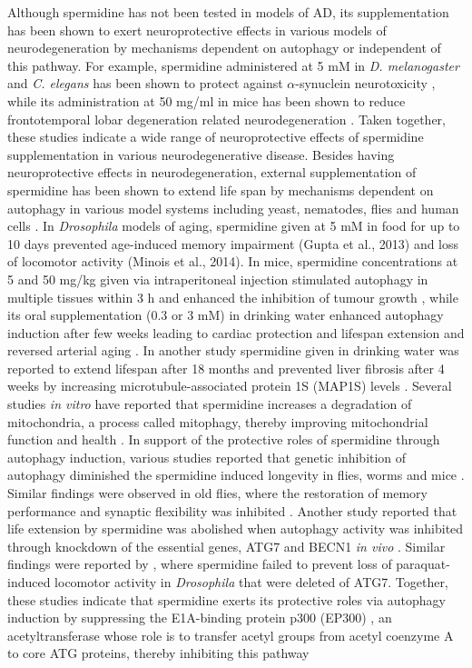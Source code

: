 Although spermidine has not been tested in models of AD, its supplementation has been shown to exert neuroprotective effects in various models of neurodegeneration  by mechanisms dependent on autophagy or independent of this pathway. For example, spermidine administered at 5 mM in \textit{D. melanogaster}  and \textit{C. elegans} has been shown to protect against $\alpha$-synuclein neurotoxicity \citep{Buttner2014}, while its administration at  50 mg/ml in mice has been shown to reduce frontotemporal lobar degeneration related neurodegeneration \citep{Wang2012}. Taken together, these studies indicate a wide range of neuroprotective effects of spermidine supplementation in various neurodegenerative disease. Besides having neuroprotective effects in neurodegeneration, external supplementation of spermidine has been shown to extend life span by mechanisms dependent on autophagy in various model systems including yeast, nematodes, flies \citep{Eisenberg2009,Minois2012,Morselli2011} and human cells \citep{Eisenberg2009,Garcia-Prat2016,Morselli2011,Pietrocola2015}. In \textit{Drosophila} models of aging, spermidine given at 5 mM in food for up to 10 days prevented age-induced memory impairment (Gupta et al., 2013) and loss of locomotor activity (Minois et al., 2014). In mice, spermidine concentrations at 5 and 50 mg/kg given via intraperitoneal injection stimulated autophagy in multiple tissues within 3 h \citep{Morselli2011,Pucciarelli2012} and enhanced the inhibition of tumour growth \citep{Pietrocola2016}, while its oral supplementation (0.3 or  3 mM) in drinking water enhanced autophagy induction after few weeks leading to cardiac protection and lifespan extension \citep{Eisenberg2016a} and reversed arterial aging \citep{LaRocca2013}. In another study spermidine given in drinking water was reported to extend lifespan after 18 months and prevented liver fibrosis after 4 weeks by increasing microtubule-associated protein 1S (MAP1S) levels \citep{Yue2017}. Several studies \textit{in vitro} have reported that spermidine increases a degradation of mitochondria, a process called mitophagy, thereby improving mitochondrial function and health \citep{Eisenberg2016a,Fan2017,Garcia-Prat2016,Qi2016}. In support of the protective roles of spermidine through autophagy induction, various studies reported that genetic inhibition of autophagy diminished the spermidine induced longevity in flies, worms \citep{Eisenberg2009} and mice \citep{Yue2017}. Similar findings were observed in old flies, where the restoration of memory performance and synaptic flexibility was inhibited \citep{Gupta2013,Gupta2016}. Another study reported that life extension by spermidine was abolished when autophagy activity was inhibited through knockdown of the essential genes, ATG7 and BECN1 \textit{in vivo} \citep{He2013}. Similar findings were reported by \citet{Minois2012}, where spermidine failed to prevent loss of paraquat-induced locomotor activity in \textit{Drosophila} that were deleted of ATG7. Together, these studies indicate that spermidine exerts its protective roles via autophagy induction by suppressing the E1A-binding protein p300 (EP300) \citep{Pietrocola2015}, an acetyltransferase whose role is to transfer acetyl groups from acetyl coenzyme A to core ATG proteins, thereby inhibiting this pathway 
